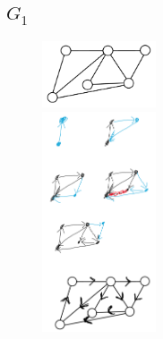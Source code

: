 \documentclass[]{article}
\numberwithin{equation}{section}
\begin{document}
\subsection{$G_1$}
\begin{figure}[h]
    \centering
    \includegraphics[width=0.3\textwidth]{figs/pblm2_G1.png}\\
    \includegraphics[width=0.3\textwidth]{figs/pblm2_G1_soln.png}
\end{figure}

\end{document}

